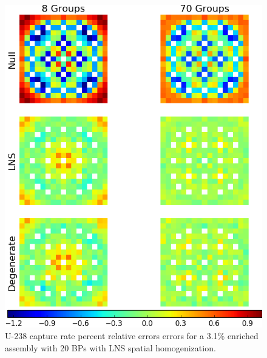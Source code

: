 \begin{figure}[h!]
\centering
\includegraphics[width=\linewidth]{figures/patterns/lns/assm-31-20BPs/capt-err}
\vspace{2mm}
\caption[U-238 capture rate errors for a 3.1\% enriched assembly with 20 BPs]{U-238 capture rate percent relative errors errors for a 3.1\% enriched assembly with 20 \acp{BP} with \ac{LNS} spatial homogenization.}
\label{fig:chap9-assm-3.1-20BPs-lns-capt-err}
\end{figure}

\clearpage

